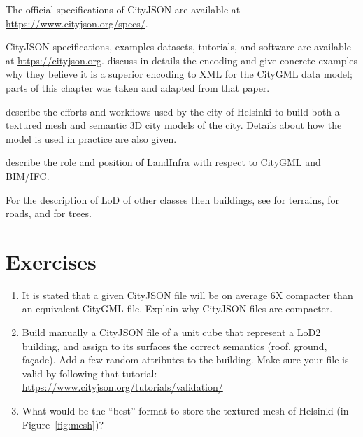 The official specifications of CityJSON are available at \url{https://www.cityjson.org/specs/}.

CityJSON specifications, examples datasets, tutorials, and software are available at \url{https://cityjson.org}.
\citet{Ledoux19} discuss in details the encoding and give concrete examples why they believe it is a superior encoding to XML for the CityGML data model; parts of this chapter was taken and adapted from that paper.

\citet{Helsinki19} describe the efforts and workflows used by the city of Helsinki to build both a textured mesh and semantic 3D city models of the city. 
Details about how the model is used in practice are also given.

\citet{Kumar19} describe the role and position of LandInfra with respect to CityGML and BIM/IFC\@.

For the description of LoD of other classes then buildings, see \citet{Kumar19} for terrains, \citet{Labetski18} for roads, and \citet{Ortega18} for trees.

%
\section{Exercises}

\begin{enumerate}
  \item It is stated that a given CityJSON file will be on average 6X compacter than an equivalent CityGML file. Explain why CityJSON files are compacter.
  \item Build manually a CityJSON file of a unit cube that represent a LoD2 building, and assign to its surfaces the correct semantics (roof, ground, façade). Add a few random attributes to the building. Make sure your file is valid by following that tutorial: \url{https://www.cityjson.org/tutorials/validation/}
  \item What would be the ``best'' format to store the textured mesh of Helsinki (in Figure~\ref{fig:mesh})?
\end{enumerate}
